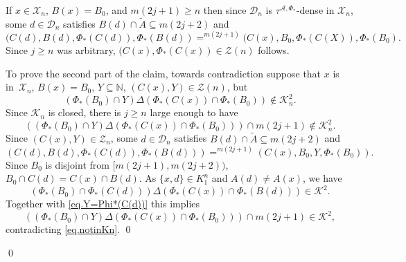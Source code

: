 \documentclass{amsart}
\makeatletter
\theoremstyle{definition}
\theoremstyle{remark}
\newcommand{\cK}{{\mathcal K}}
\renewcommand{\proofname}{Proof}
\renewenvironment{proof}[1][\proofname]{\par
\let\oldqedsymbol\qedsymbol             %
  \normalfont
  \topsep6\p@\@plus6\p@ \trivlist
  \item[\hskip\labelsep\hskip\parindent\scshape
    #1\@addpunct{.}]\ignorespaces
}{%
  \qed\endtrivlist
\global\let\qedsymbol\oldqedsymbol      %
}
\newcommand{\bbN}{\mathbb N}
\newcommand{\cA}{\mathcal A}
\newcommand{\cX}{\mathcal X}
\newcommand{\cZ}{\mathcal Z}
\newcommand{\calD}{{\mathcal D}}
\numberwithin{claim}{subsection}
\makeatother
\begin{document}
\begin{proof}
\begin{proof} If $x\in \cX_n$, $B(x)=B_0$,  and $m(2j+1)\geq n$  then since $\calD_n$ is $\tau^{\cA,\Phi_*}$-dense in $\cX_n$,  some $d\in \calD_n$ satisfies 	$B(d)\cap \tilde A \subseteq  m(2j+2)$ and 
	\[
	(C(d), B(d), \Phi_*(C(d)), \Phi_*(B(d))=^{m(2j+1)} 
	(C(x), B_0, \Phi_*(C(X)), \Phi_*(B_0). 
	\]  
  Since $j\geq n$ was arbitrary, $(C(x), \Phi_*(C(x))\in \cZ(n)$ follows. 

To prove the second part of the claim, towards contradiction suppose that $x$ is in~$\cX_n$, $B(x)=B_0$, $Y\subseteq \bbN$,  $(C(x),Y)\in \cZ(n)$, but 
\[
(\Phi_*(B_0)\cap Y) \Delta (\Phi_*(C(x))\cap \Phi_*(B_0))\notin {\cK_n^2} .
\]
Since $\cK_n$ is closed, there is $j\geq n$ large enough to have 
\begin{equation}\label{eq.notinKn}
(( \Phi_*(B_0)\cap Y) \Delta (\Phi_*(C(x))\cap \Phi_*(B_0)))\cap m(2j+1)\notin {\cK_n^2} .
\end{equation}
Since $(C(x), Y)\in \cZ_n$, some $d\in \calD_n$ satisfies
$B(d)\cap \tilde A\subseteq m(2j+2)$ and   \begin{equation}\label{eq.Y=Phi*(C(d))}
(C(d), B(d), \Phi_*(C(d)), \Phi_*(B(d)))=^{m(2j+1)} 
(C(x), B_0, Y, \Phi_*(B_0)).
\end{equation}
Since $B_0$ is disjoint from $[m(2j+1), m(2j+2))$, $B_0\cap C(d)=C(x)\cap B(d)$. 
As $\{x,d\}\in K^n_1$ and  $A(d)\neq A(x)$, we have 
\[
(\Phi_*(B_0)\cap \Phi_*(C(d)))\Delta (\Phi_*(C(x))\cap
\Phi_*(B(d)))\in \cK^2.
\]
Together with \eqref{eq.Y=Phi*(C(d))} this implies 
\[
((\Phi_*(B_0)\cap Y)\Delta (\Phi_*(C(x))\cap
\Phi_*(B_0)))\cap m(2j+1)\in \cK^2, 
\]
contradicting \eqref{eq.notinKn}. 
\end{proof}


\end{proof}
\end{document}
